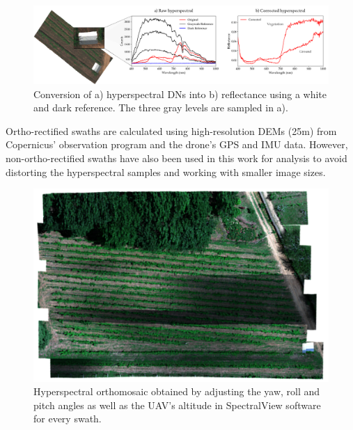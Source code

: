 \begin{figure}[!ht]
    \centering
    \includegraphics{figs/materials/spectral_view_rectification.png}
    \caption{Conversion of a) hyperspectral DNs into b) reflectance using a white and dark reference. The three gray levels are sampled in a).}
    \label{fig:hyperspectral_rectification}
\end{figure}

Ortho-rectified swaths are calculated using high-resolution DEMs (25\si{\meter}) from Copernicus' observation program \cite{european_environment_agency_eu_2017} and the drone's GPS and IMU data. However, non-ortho-rectified swaths have also been used in this work for analysis to avoid distorting the hyperspectral samples and working with smaller image sizes.

\begin{figure}[!ht]
    \centering
    \includegraphics[width=0.8\linewidth]{figs/materials/orthorectified_hyper.png}
    \caption{Hyperspectral orthomosaic obtained by adjusting the yaw, roll and pitch angles as well as the UAV's altitude in SpectralView\texttrademark \hspace{1mm} software for every swath.}
    \label{fig:orthorectified_hyper}
\end{figure}

